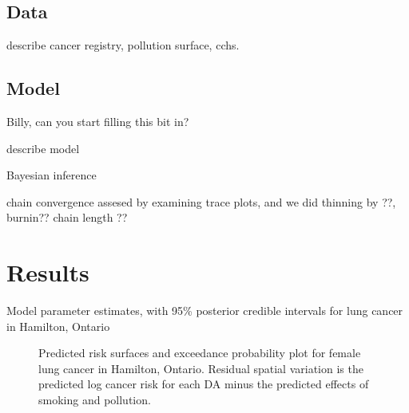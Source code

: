 \documentclass[12pt]{article}
\begin{document}
\subsection{Data}
describe cancer registry, pollution surface, cchs.

\subsection{Model}

Billy, can you start filling this bit in?

describe model

Bayesian inference

chain convergence assesed by examining trace plots, and we did thinning by ??, burnin?? chain length ??

\section{Results}



\begin{table}[H]


\caption{Model parameter estimates, with 95\% posterior credible intervals for lung cancer in Hamilton, Ontario}
\label{tab:parameters}
\end{table}


\begin{figure}[H]
\caption{Predicted risk surfaces and exceedance probability plot for female lung cancer in Hamilton, Ontario.  Residual spatial variation is the predicted log cancer risk for each DA minus the predicted effects of smoking and pollution.}
\label{fig:female}
\end{figure}
\end{document}
